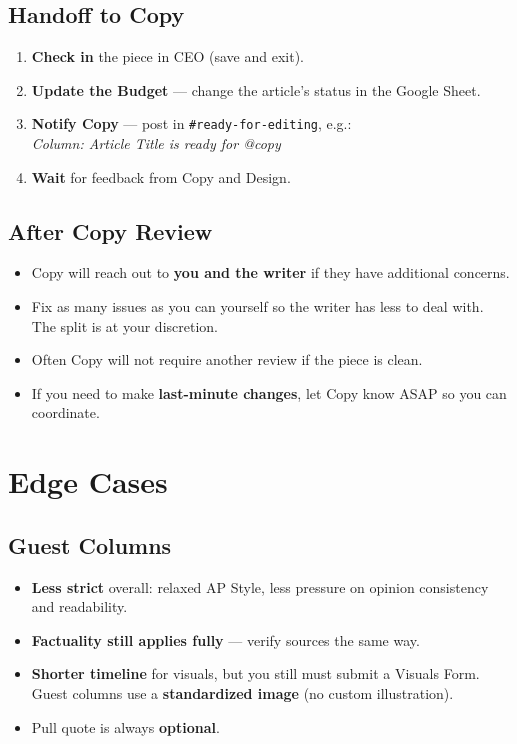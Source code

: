\documentclass[12pt]{article}
\begin{document}
\subsection{Handoff to Copy}

\begin{enumerate}
    \item \textbf{Check in} the piece in CEO (save and exit).
    \item \textbf{Update the Budget} --- change the article's status in the Google Sheet.
    \item \textbf{Notify Copy} --- post in \texttt{\#ready-for-editing}, e.g.:\\
    \textit{Column: Article Title is ready for @copy}
    \item \textbf{Wait} for feedback from Copy and Design.
\end{enumerate}

\subsection{After Copy Review}

\begin{itemize}
    \item Copy will reach out to \textbf{you and the writer} if they have additional concerns.
    \item Fix as many issues as you can yourself so the writer has less to deal with. The split is at your discretion.
    \item Often Copy will not require another review if the piece is clean.
    \item If you need to make \textbf{last-minute changes}, let Copy know ASAP so you can coordinate.
\end{itemize}

\section{Edge Cases}

\subsection{Guest Columns}

\begin{itemize}
    \item \textbf{Less strict} overall: relaxed AP Style, less pressure on opinion consistency and readability.
    \item \textbf{Factuality still applies fully} --- verify sources the same way.
    \item \textbf{Shorter timeline} for visuals, but you still must submit a Visuals Form. Guest columns use a \textbf{standardized image} (no custom illustration).
    \item Pull quote is always \textbf{optional}.
\end{itemize}
\end{document}
